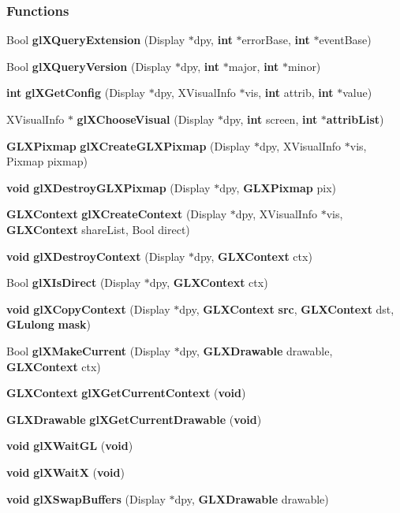 \subsubsection*{Functions}
\begin{DoxyCompactItemize}
\item 
Bool {\bf gl\+X\+Query\+Extension} (Display $\ast$dpy, {\bf int} $\ast$error\+Base, {\bf int} $\ast$event\+Base)
\item 
Bool {\bf gl\+X\+Query\+Version} (Display $\ast$dpy, {\bf int} $\ast$major, {\bf int} $\ast$minor)
\item 
{\bf int} {\bf gl\+X\+Get\+Config} (Display $\ast$dpy, X\+Visual\+Info $\ast$vis, {\bf int} attrib, {\bf int} $\ast$value)
\item 
X\+Visual\+Info $\ast$ {\bf gl\+X\+Choose\+Visual} (Display $\ast$dpy, {\bf int} screen, {\bf int} $\ast${\bf attrib\+List})
\item 
{\bf G\+L\+X\+Pixmap} {\bf gl\+X\+Create\+G\+L\+X\+Pixmap} (Display $\ast$dpy, X\+Visual\+Info $\ast$vis, Pixmap pixmap)
\item 
{\bf void} {\bf gl\+X\+Destroy\+G\+L\+X\+Pixmap} (Display $\ast$dpy, {\bf G\+L\+X\+Pixmap} pix)
\item 
{\bf G\+L\+X\+Context} {\bf gl\+X\+Create\+Context} (Display $\ast$dpy, X\+Visual\+Info $\ast$vis, {\bf G\+L\+X\+Context} share\+List, Bool direct)
\item 
{\bf void} {\bf gl\+X\+Destroy\+Context} (Display $\ast$dpy, {\bf G\+L\+X\+Context} ctx)
\item 
Bool {\bf gl\+X\+Is\+Direct} (Display $\ast$dpy, {\bf G\+L\+X\+Context} ctx)
\item 
{\bf void} {\bf gl\+X\+Copy\+Context} (Display $\ast$dpy, {\bf G\+L\+X\+Context} {\bf src}, {\bf G\+L\+X\+Context} dst, {\bf G\+Lulong} {\bf mask})
\item 
Bool {\bf gl\+X\+Make\+Current} (Display $\ast$dpy, {\bf G\+L\+X\+Drawable} drawable, {\bf G\+L\+X\+Context} ctx)
\item 
{\bf G\+L\+X\+Context} {\bf gl\+X\+Get\+Current\+Context} ({\bf void})
\item 
{\bf G\+L\+X\+Drawable} {\bf gl\+X\+Get\+Current\+Drawable} ({\bf void})
\item 
{\bf void} {\bf gl\+X\+Wait\+GL} ({\bf void})
\item 
{\bf void} {\bf gl\+X\+WaitX} ({\bf void})
\item 
{\bf void} {\bf gl\+X\+Swap\+Buffers} (Display $\ast$dpy, {\bf G\+L\+X\+Drawable} drawable)
\item 

\end{DoxyCompactItemize}
